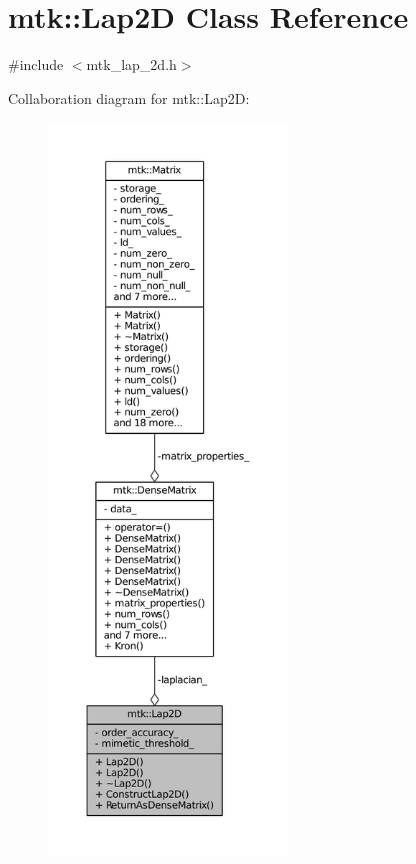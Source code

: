\hypertarget{classmtk_1_1Lap2D}{\section{mtk\-:\-:Lap2\-D Class Reference}
\label{classmtk_1_1Lap2D}
}


{\ttfamily \#include $<$mtk\-\_\-lap\-\_\-2d.\-h$>$}



Collaboration diagram for mtk\-:\-:Lap2\-D\-:
\nopagebreak
\begin{figure}[H]
\begin{center}
\leavevmode
\includegraphics[height=550pt]{classmtk_1_1Lap2D__coll__graph}
\end{center}
\end{figure}
